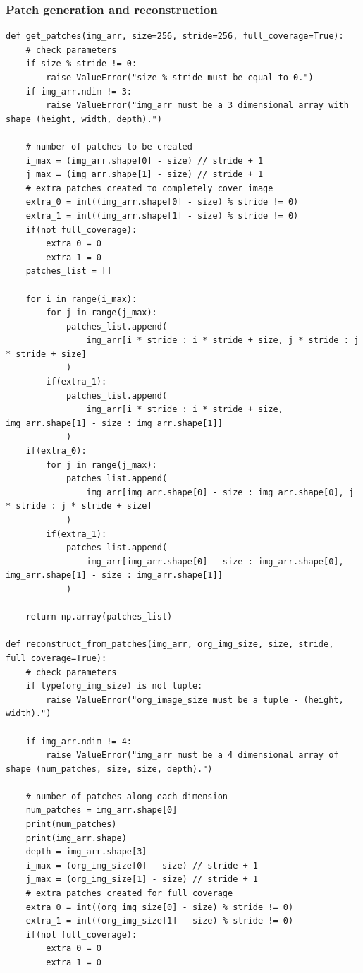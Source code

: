 \documentclass[12pt, a4paper]{report}
\begin{document}
\subsubsection*{Patch generation and reconstruction}
\begin{verbatim}
def get_patches(img_arr, size=256, stride=256, full_coverage=True):
    # check parameters
    if size % stride != 0:
        raise ValueError("size % stride must be equal to 0.")
    if img_arr.ndim != 3:
        raise ValueError("img_arr must be a 3 dimensional array with shape (height, width, depth).")

    # number of patches to be created
    i_max = (img_arr.shape[0] - size) // stride + 1
    j_max = (img_arr.shape[1] - size) // stride + 1
    # extra patches created to completely cover image
    extra_0 = int((img_arr.shape[0] - size) % stride != 0)
    extra_1 = int((img_arr.shape[1] - size) % stride != 0)
    if(not full_coverage):
        extra_0 = 0
        extra_1 = 0
    patches_list = []

    for i in range(i_max):
        for j in range(j_max):
            patches_list.append(
                img_arr[i * stride : i * stride + size, j * stride : j * stride + size]
            )
        if(extra_1):
            patches_list.append(
                img_arr[i * stride : i * stride + size, img_arr.shape[1] - size : img_arr.shape[1]]
            )
    if(extra_0):
        for j in range(j_max):
            patches_list.append(
                img_arr[img_arr.shape[0] - size : img_arr.shape[0], j * stride : j * stride + size]
            )
        if(extra_1):
            patches_list.append(
                img_arr[img_arr.shape[0] - size : img_arr.shape[0], img_arr.shape[1] - size : img_arr.shape[1]]
            )

    return np.array(patches_list)

def reconstruct_from_patches(img_arr, org_img_size, size, stride, full_coverage=True):
    # check parameters
    if type(org_img_size) is not tuple:
        raise ValueError("org_image_size must be a tuple - (height, width).")

    if img_arr.ndim != 4:
        raise ValueError("img_arr must be a 4 dimensional array of shape (num_patches, size, size, depth).")
    
    # number of patches along each dimension
    num_patches = img_arr.shape[0]
    print(num_patches)
    print(img_arr.shape)
    depth = img_arr.shape[3]
    i_max = (org_img_size[0] - size) // stride + 1
    j_max = (org_img_size[1] - size) // stride + 1
    # extra patches created for full coverage
    extra_0 = int((org_img_size[0] - size) % stride != 0)
    extra_1 = int((org_img_size[1] - size) % stride != 0)
    if(not full_coverage):
        extra_0 = 0
        extra_1 = 0


\end{verbatim}
\end{document}
